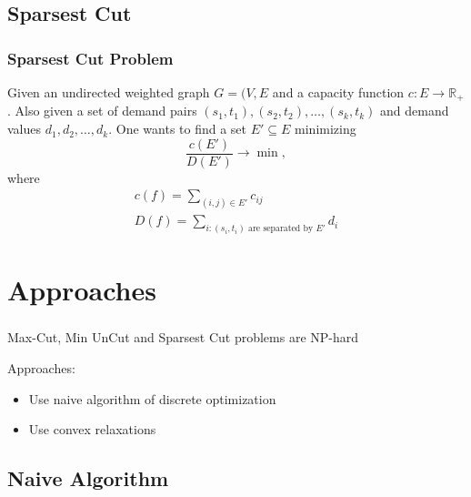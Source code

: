 \documentclass[10pt]{beamer}
\begin{document}
	\subsection{Sparsest Cut}
	
		\begin{frame}
			\frametitle{Sparsest Cut Problem}
			
			Given an undirected weighted graph $G = (V, E$ and a capacity function $c 
			: E \rightarrow \mathbb R_+$.
			Also given a set of demand pairs $(s_1, t_1), (s_2, t_2), \dots, (s_k, t_k)$ and 
			demand values $d_1, d_2, \dots, d_k$.
			One wants to find a set $E' \subseteq E$ minimizing
			\[
				\frac{c(E') }{ D(E') } \rightarrow \min,
			\]
			where
			\begin{gather*}
				c(f) = \sum\limits_{(i, j) \in E'} c_{ij} \\
				D(f) = \sum\limits_{i : (s_i, t_i) \text{ are separated by } E'} d_i
			\end{gather*}
			
		\end{frame}

\section{Approaches}

	\begin{frame}
		\frametitle{}
		
		Max-Cut, Min UnCut and Sparsest Cut problems are NP-hard
		
		\pause
		\vspace{0.5in}
		
		Approaches:
		\begin{itemize}
			\item Use naive algorithm of discrete optimization
			\item Use convex relaxations
		\end{itemize}
	\end{frame}

	\subsection{Naive Algorithm}
\end{document}
